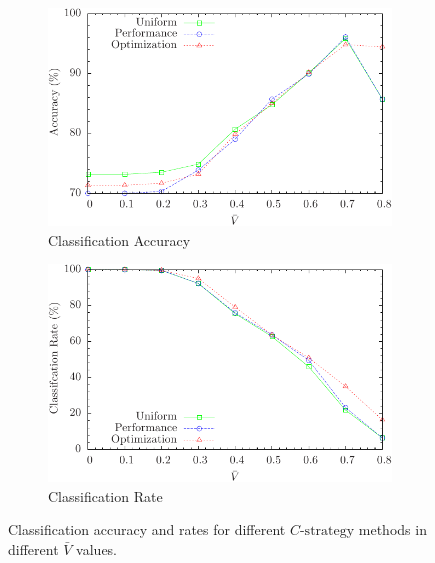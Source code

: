 \begin{figure} [ht]
\centering
\begin{subfigure}{.49\textwidth}
  \centering
  \includegraphics[width=.95\linewidth]{../Figure/threshould_accuracy}
  \caption{Classification Accuracy}
  \label{fig:threshould_accuracy}
\end{subfigure}%
\begin{subfigure}{.49\textwidth}
  \centering
  \includegraphics[width=.95\linewidth]{../Figure/threshould_rate}
  \caption{Classification Rate}
  \label{fig:threshould_rate}
\end{subfigure}
\caption{Classification accuracy and rates for different $C\text{-strategy}$ methods in different $\bar{V}$ values.}
\label{fig:threshoulds}
\end{figure}

